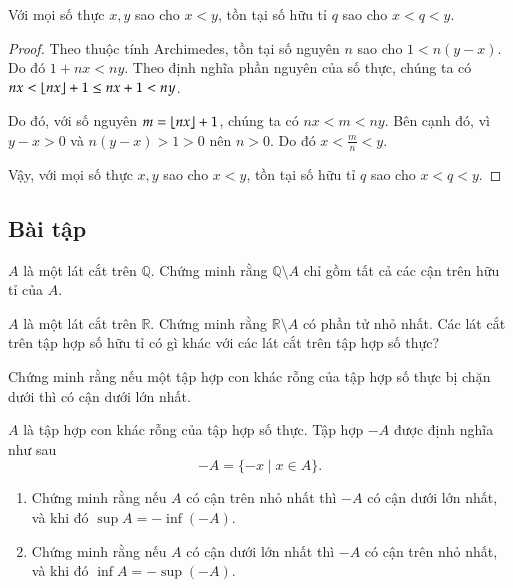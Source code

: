 \begin{theorem}
	Với mọi số thực $x, y$ sao cho $x < y$, tồn tại số hữu tỉ $q$ sao cho $x < q < y$.
\end{theorem}

\begin{proof}
	Theo thuộc tính Archimedes, tồn tại số nguyên $n$ sao cho $1 < n(y - x)$. Do đó $1 + nx < ny$. Theo định nghĩa phần nguyên của số thực, chúng ta có $nx < \left\lfloor{nx}\right\rfloor + 1 \leq nx + 1 < ny$.

	Do đó, với số nguyên $m = \left\lfloor{nx}\right\rfloor + 1$, chúng ta có $nx < m < ny$. Bên cạnh đó, vì $y - x > 0$ và $n(y - x) > 1 > 0$ nên $n > 0$. Do đó $x < \frac{m}{n} < y$.

	Vậy, với mọi số thực $x, y$ sao cho $x < y$, tồn tại số hữu tỉ $q$ sao cho $x < q < y$.
\end{proof}

\subsection{Bài tập}

\begin{exercise}
	$A$ là một lát cắt trên $\mathbb{Q}$. Chứng minh rằng $\mathbb{Q}\setminus A$ chỉ gồm tất cả các cận trên hữu tỉ của $A$.
\end{exercise}

\begin{exercise}
	$A$ là một lát cắt trên $\mathbb{R}$. Chứng minh rằng $\mathbb{R}\setminus A$ có phần tử nhỏ nhất. Các lát cắt trên tập hợp số hữu tỉ có gì khác với các lát cắt trên tập hợp số thực?
\end{exercise}

\begin{exercise}
	Chứng minh rằng nếu một tập hợp con khác rỗng của tập hợp số thực bị chặn dưới thì có cận dưới lớn nhất.
\end{exercise}

\begin{exercise}
	$A$ là tập hợp con khác rỗng của tập hợp số thực. Tập hợp $-A$ được định nghĩa như sau
	\[
		-A = \{ -x \mid x\in A \}.
	\]
	\begin{enumerate}[label={(\roman*)}]
		\item Chứng minh rằng nếu $A$ có cận trên nhỏ nhất thì $-A$ có cận dưới lớn nhất, và khi đó $\sup A = -\inf (-A)$.
		\item Chứng minh rằng nếu $A$ có cận dưới lớn nhất thì $-A$ có cận trên nhỏ nhất, và khi đó $\inf A = -\sup (-A)$.
	\end{enumerate}
\end{exercise}

